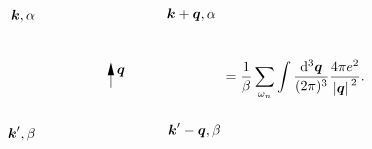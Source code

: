 \begin{equation}
\begin{gathered}
\begin{tikzpicture}[x=0.75pt,y=0.75pt,yscale=-1,xscale=1]
            \draw    (169.09,129.1) -- (169.09,107.04) ;
            \draw [shift={(169.09,105.04)}, rotate = 450] [fill={rgb, 255:red, 0; green, 0; blue, 0 }  ][line width=0.08]  [draw opacity=0] (12,-3) -- (0,0) -- (12,3) -- cycle    ;
            
            \draw (97.72,60.8) node [anchor=east] [inner sep=0.75pt]    {$\boldsymbol{k} ,\alpha $};
            \draw (221.22,59.47) node [anchor=west] [inner sep=0.75pt]    {$\boldsymbol{k} +\boldsymbol{q} ,\alpha $};
            \draw (173.48,108.5) node [anchor=north west][inner sep=0.75pt]    {$\boldsymbol{q}$};
            \draw (98.17,172.51) node [anchor=east] [inner sep=0.75pt]    {$\boldsymbol{k} ',\beta $};
            \draw (222.46,169.26) node [anchor=west] [inner sep=0.75pt]    {$\boldsymbol{k} '-\boldsymbol{q} ,\beta $};
            \end{tikzpicture}
    \end{gathered} = \frac{1}{\beta} \sum_{\omega_n} \int \frac{\dd[3]{\vb*{q}}}{(2\pi)^3} \frac{4\pi e^2}{\abs*{\vb*{q}}^2}.
\end{equation}